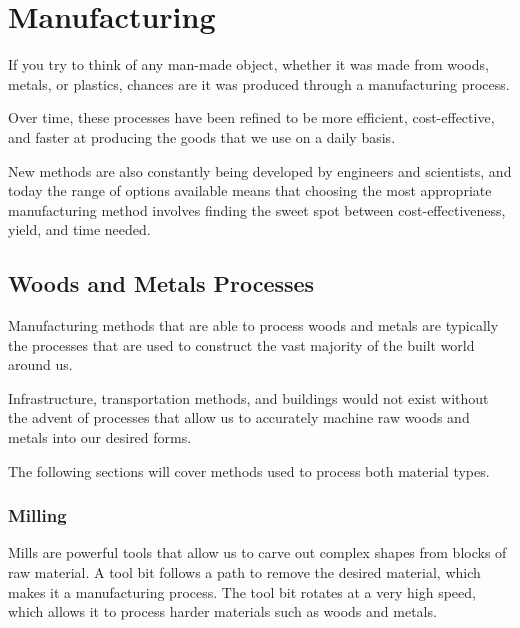 \chapter{Manufacturing}

If you try to think of any man-made object, whether it was made from woods, metals, or plastics, chances are it was produced through a manufacturing process.

Over time, these processes have been refined to be more efficient, cost-effective, and faster at producing the goods that we use on a daily basis.

New methods are also constantly being developed by engineers and scientists, and today the range of options available means that choosing the most appropriate manufacturing method involves finding the sweet spot between cost-effectiveness, yield, and time needed.

\section{Woods and Metals Processes}

Manufacturing methods that are able to process woods and metals are typically the processes that are used to construct the vast majority of the built world around us. 

Infrastructure, transportation methods, and buildings would not exist without the advent of processes that allow us to accurately machine raw woods and metals into our desired forms.

The following sections will cover methods used to process both material types.

\subsection{Milling}

Mills are powerful tools that allow us to carve out complex shapes from blocks of raw material. A tool bit follows a path to remove the desired material, which makes it a  manufacturing process. The tool bit rotates at a very high speed, which allows it to process harder materials such as woods and metals.


